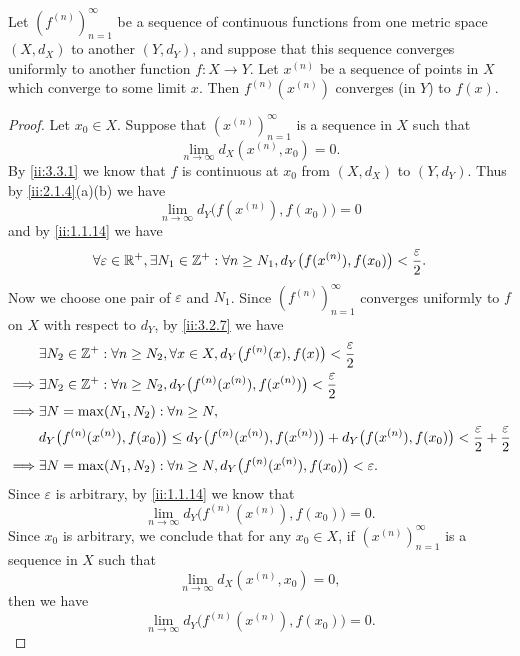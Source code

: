 \begin{prop}\label{ii:3.3.4}
  Let \((f^{(n)})_{n = 1}^\infty\) be a sequence of continuous functions from one metric space \((X, d_X)\) to another \((Y, d_Y)\), and suppose that this sequence converges uniformly to another function \(f : X \to Y\).
  Let \(x^{(n)}\) be a sequence of points in \(X\) which converge to some limit \(x\).
  Then \(f^{(n)}(x^{(n)})\) converges (in \(Y\)) to \(f(x)\).
\end{prop}

\begin{proof}
  Let \(x_0 \in X\).
  Suppose that \((x^{(n)})_{n = 1}^\infty\) is a sequence in \(X\) such that
  \[
    \lim_{n \to \infty} d_X(x^{(n)}, x_0) = 0.
  \]
  By \cref{ii:3.3.1} we know that \(f\) is continuous at \(x_0\) from \((X, d_X)\) to \((Y, d_Y)\).
  Thus by \cref{ii:2.1.4}(a)(b) we have
  \[
    \lim_{n \to \infty} d_Y\big(f(x^{(n)}), f(x_0)\big) = 0
  \]
  and by \cref{ii:1.1.14} we have
  \[
    \forall \varepsilon \in \mathbb{R}^+, \exists N_1 \in \mathbb{Z}^+ : \forall n \geq N_1, d_Y\big(f(x^{(n)}), f(x_0)\big) < \dfrac{\varepsilon}{2}.
  \]
  Now we choose one pair of \(\varepsilon\) and \(N_1\).
  Since \((f^{(n)})_{n = 1}^\infty\) converges uniformly to \(f\) on \(X\) with respect to \(d_Y\), by \cref{ii:3.2.7} we have
  \begin{align*}
             & \exists N_2 \in \mathbb{Z}^+ : \forall n \geq N_2, \forall x \in X, d_Y\big(f^{(n)}(x), f(x)\big) < \dfrac{\varepsilon}{2}                                                       \\
    \implies & \exists N_2 \in \mathbb{Z}^+ : \forall n \geq N_2, d_Y\big(f^{(n)}(x^{(n)}), f(x^{(n)})\big) < \dfrac{\varepsilon}{2}                                                            \\
    \implies & \exists N = \max(N_1, N_2) : \forall n \geq N,                                                                                                                           \\
             & d_Y\big(f^{(n)}(x^{(n)}), f(x_0)\big) \leq d_Y\big(f^{(n)}(x^{(n)}), f(x^{(n)})\big) + d_Y\big(f(x^{(n)}), f(x_0)\big) < \dfrac{\varepsilon}{2} + \dfrac{\varepsilon}{2} \\
    \implies & \exists N = \max(N_1, N_2) : \forall n \geq N, d_Y\big(f^{(n)}(x^{(n)}), f(x_0)\big) < \varepsilon.
  \end{align*}
  Since \(\varepsilon\) is arbitrary, by \cref{ii:1.1.14} we know that
  \[
    \lim_{n \to \infty} d_Y\big(f^{(n)}(x^{(n)}), f(x_0)\big) = 0.
  \]
  Since \(x_0\) is arbitrary, we conclude that for any \(x_0 \in X\), if \((x^{(n)})_{n = 1}^\infty\) is a sequence in \(X\) such that
  \[
    \lim_{n \to \infty} d_X(x^{(n)}, x_0) = 0,
  \]
  then we have
  \[
    \lim_{n \to \infty} d_Y\big(f^{(n)}(x^{(n)}), f(x_0)\big) = 0.
  \]
\end{proof}


